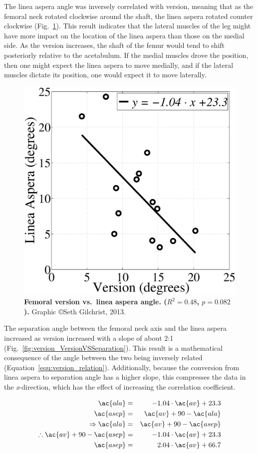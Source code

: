 The linea aspera angle was inversely correlated with version, meaning that as the femoral neck rotated clockwise around the shaft, the linea aspera rotated counter clockwise (Fig.~\ref{fig:version_VersionVSLA}).
This result indicates that the lateral muscles of the leg might have more impact on the location of the linea aspera than those on the medial side.
As the version increases, the shaft of the femur would tend to shift posteriorly relative to the acetabulum.
If the medial muscles drove the position, then one might expect the linea aspera to move medially, and if the lateral muscles dictate its position, one would expect it to move laterally.

\begin{figure}
\centering
\includegraphics[width=0.7\linewidth]{./appendixVersion/figures/VersionVSLA}
\caption[Linea aspera \acs*{vs} version]{\textbf{Femoral version vs.\ linea aspera angle. ($R^2 = 0.48$, $p = 0.082$).} Graphic \copyright Seth Gilchrist, 2013.}
\label{fig:version_VersionVSLA}
\end{figure}

The separation angle between the femoral neck axis and the linea aspera increased as version increased with a slope of about 2:1 (Fig.~\ref{fig:version_VersionVSSeparation}).
This result is a mathematical consequence of the angle between the two being inversely related (Equation~\ref{equ:version_relation}).
Additionally, because the conversion from linea aspera to separation angle has a higher slope, this compresses the data in the \textit{x}-direction, which has the effect of increasing the correlation coefficient.

\begin{eqnarray}
 \ac{ala}  &=& -1.04 \cdot \ac{av} +23.3 \nonumber \\
 \ac{asep} &=& \ac{av}+90-\ac{ala} \nonumber\\
 \Rightarrow \ac{ala} &=& \ac{av}+90-\ac{asep} \nonumber \\
 \therefore \ac{av}+90-\ac{asep} &=&  -1.04 \cdot \ac{av}+23.3 \nonumber\\
 \ac{asep} &=& 2.04 \cdot \ac{av} +66.7 \label{equ:version_relation}
\end{eqnarray}

